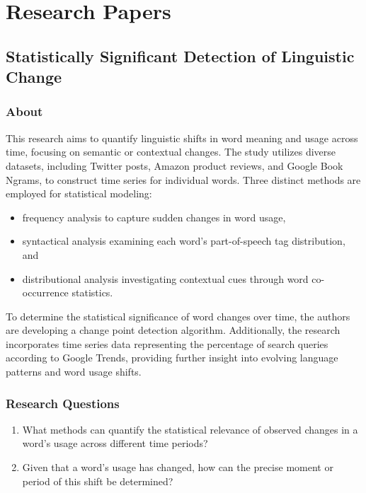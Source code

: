 
\section{Research Papers} \label{sec:paper}
\subsection{Statistically Significant Detection of Linguistic Change}\label{subsec:statistically-significant-detection-of-linguistic-change}

\subsubsection{About}
This research aims to quantify linguistic shifts in word meaning and usage across time, focusing on semantic or contextual changes.
The study utilizes diverse datasets, including Twitter posts, Amazon product reviews, and Google Book Ngrams, to construct time series for individual words.
Three distinct methods are employed for statistical modeling:
\begin{itemize}
    \item frequency analysis to capture sudden changes in word usage,
    \item syntactical analysis examining each word's part-of-speech tag distribution, and
    \item distributional analysis investigating contextual cues through word co-occurrence statistics.
\end{itemize}
To determine the statistical significance of word changes over time, the authors are developing a change point detection algorithm.
Additionally, the research incorporates time series data representing the percentage of search queries according to Google Trends, providing further insight into evolving language patterns and word usage shifts.

\subsubsection{Research Questions}
\begin{enumerate}
\item What methods can quantify the statistical relevance of observed changes in a word's usage across different time periods?
\item Given that a word's usage has changed, how can the precise moment or period of this shift be determined?
\end{enumerate}

